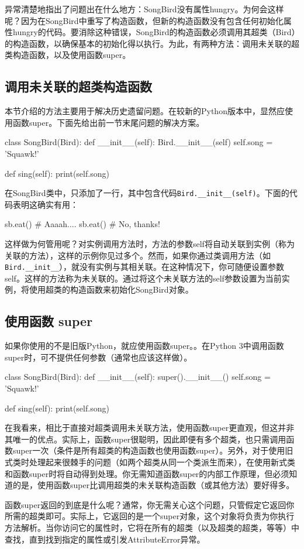 异常清楚地指出了问题出在什么地方：SongBird没有属性hungry。为何会这样呢？因为在SongBird中重写了构造函数，但新的构造函数没有包含任何初始化属性hungry的代码。要消除这种错误，SongBird的构造函数必须调用其超类（Bird）的构造函数，以确保基本的初始化得以执行。为此，有两种方法：调用未关联的超类构造函数，以及使用函数super。

\subsection{调用未关联的超类构造函数}
本节介绍的方法主要用于解决历史遗留问题。在较新的Python版本中，显然应使用函数super。下面先给出前一节末尾问题的解决方案。

\begin{pyc}
class SongBird(Bird):
    def __init__(self):
        Bird.__init__(self)
        self.song = 'Squawk!'

    def sing(self):
        print(self.song)
\end{pyc}
在SongBird类中，只添加了一行，其中包含代码\verb|Bird.__init__(self)|。下面的代码表明这确实有用：
\begin{pyc}
sb.eat()  # Aaaah....
sb.eat()  # No, thanks!
\end{pyc}
这样做为何管用呢？对实例调用方法时，方法的参数self将自动关联到实例（称为关联的方法），这样的示例你见过多个。然而，如果你通过类调用方法（如\verb|Bird.__init__|），就没有实例与其相关联。在这种情况下，你可随便设置参数self。这样的方法称为未关联的。通过将这个未关联方法的self参数设置为当前实例，将使用超类的构造函数来初始化SongBird对象。
\subsection{使用函数 super}
如果你使用的不是旧版Python，就应使用函数super。。在Python 3中调用函数super时，可不提供任何参数（通常也应该这样做）。
\begin{pyc}
class SongBird(Bird):
    def __init__(self):
        super().__init__()
        self.song = 'Squawk!'

    def sing(self):
        print(self.song)
\end{pyc}
\begin{tcolorbox}[title=使用函数super有何优点]
在我看来，相比于直接对超类调用未关联方法，使用函数super更直观，但这并非其唯一的优点。实际上，函数super很聪明，因此即便有多个超类，也只需调用函数super一次（条件是所有超类的构造函数也使用函数super）。另外，对于使用旧式类时处理起来很棘手的问题（如两个超类从同一个类派生而来），在使用新式类和函数super时将自动得到处理。你无需知道函数super的内部工作原理，但必须知道的是，使用函数super比调用超类的未关联构造函数（或其他方法）要好得多。

函数super返回的到底是什么呢？通常，你无需关心这个问题，只管假定它返回你所需的超类即可。实际上，它返回的是一个super对象，这个对象将负责为你执行方法解析。当你访问它的属性时，它将在所有的超类（以及超类的超类，等等）中查找，直到找到指定的属性或引发AttributeError异常。
\end{tcolorbox}
